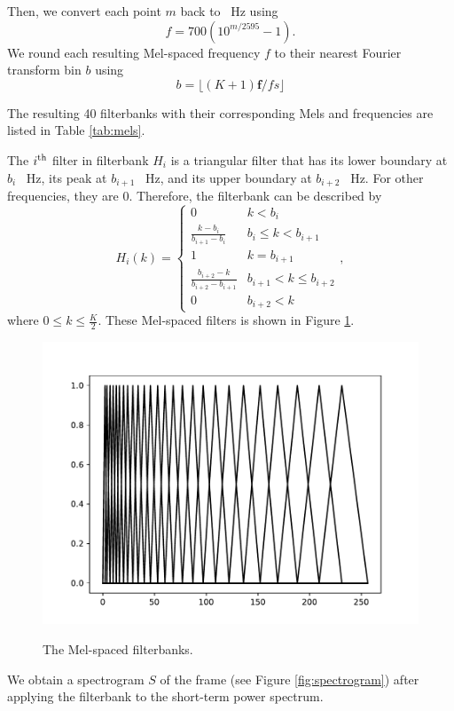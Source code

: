 			Then, we convert each point $m$ back to \SI{}{\Hz} using
			\begin{equation}
				f = 700\left(10^{m/2595}-1\right).
			\end{equation}
			We round each resulting Mel-spaced frequency $f$ to their nearest Fourier transform bin $b$ using
			\begin{equation}
				b = \lfloor(K+1)\mathbf{f}/fs\rfloor
			\end{equation}

			The resulting 40 filterbanks with their corresponding Mels and frequencies are listed in Table \ref{tab:mels}.

			The $i\textsuperscript{th}$ filter in filterbank $H_i$ is a triangular filter that has its lower boundary at $b_{i}$ \SI{}{\Hz}, its peak at $b_{i+1}$ \SI{}{\Hz}, and its upper boundary at $b_{i+2}$ \SI{}{\Hz}.
			For other frequencies, they are 0.
			Therefore, the filterbank can be described by
			\begin{equation}
				H_i(k) = \begin{cases}
					0 & k<b_i\\
					\frac{k-b_i}{b_{i+1}-b_i} & b_i\leq k < b_{i+1} \\
					1 & k = b_{i+1} \\
					\frac{b_{i+2} - k}{b_{i+2}-b_{i+1}} & b_{i+1} < k \leq b_{i+2}\\
					0 & b_{i+2} < k
				\end{cases},
			\end{equation}
			where $0 \leq k \leq \frac{K}{2}$.
			These Mel-spaced filters is shown in Figure \ref{fig:filterbank}.
			\begin{figure}[ht]
				\centering
			    \includegraphics[width=.45\linewidth]{gfx/fbanks}
			    \label{fig:filterbank}
			    \caption{The Mel-spaced filterbanks.}
			\end{figure}

			We obtain a spectrogram $S$ of the frame (see \eg Figure \ref{fig:spectrogram}) after applying the filterbank to the short-term power spectrum.

